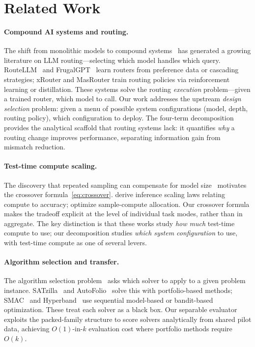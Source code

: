 
\section{Related Work}
\label{sec:related}

\paragraph{Compound AI systems and routing.}
The shift from monolithic models to compound
systems~\citep{zaharia2024compound} has generated a growing literature on
LLM routing---selecting which model handles which query.
RouteLLM~\citep{ong2024routellm} and
FrugalGPT~\citep{chen2023frugalgpt} learn routers from preference data
or cascading strategies; xRouter and MasRouter train routing policies via
reinforcement learning or distillation.  These systems solve the routing \emph{execution}
problem---given a trained router, which model to call.  Our work addresses
the upstream \emph{design selection} problem: given a menu of possible
system configurations (model, depth, routing policy), which configuration
to deploy.  The four-term decomposition provides the analytical scaffold
that routing systems lack: it quantifies \emph{why} a routing change
improves performance, separating information gain from mismatch reduction.

\paragraph{Test-time compute scaling.}
The discovery that repeated sampling can compensate for model
size~\citep{brown2024monkeys,snell2025testtime} motivates the
crossover formula~\eqref{eq:crossover}.
\citet{wu2025inference} derive inference scaling laws relating compute
to accuracy; \citet{osca2024} optimize sample-compute allocation.
Our crossover formula makes the tradeoff explicit at the level of individual
task modes, rather than in aggregate.
The key distinction is that these works study \emph{how much}
test-time compute to use; our decomposition studies \emph{which system
configuration} to use, with test-time compute as one of several levers.

\paragraph{Algorithm selection and transfer.}
The algorithm selection problem~\citep{rice1976algorithm} asks which
solver to apply to a given problem instance.
SATzilla~\citep{xu2012satzilla} and AutoFolio~\citep{lindauer2015autofolio}
solve this with portfolio-based methods; SMAC~\citep{hutter2011smac} and
Hyperband~\citep{li2017hyperband} use sequential model-based or
bandit-based optimization.  These treat each solver as a black box.
Our separable evaluator exploits the packed-family structure to score
solvers analytically from shared pilot data, achieving $O(1)$-in-$k$
evaluation cost where portfolio methods require $O(k)$.

